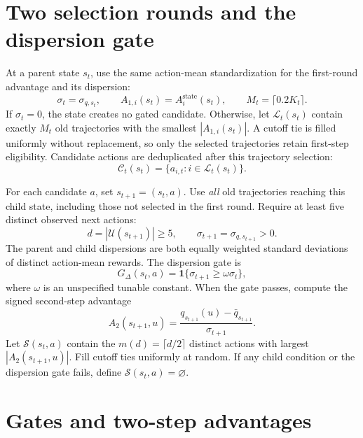 \documentclass[10pt]{article}
\begin{document}
\section{Two selection rounds and the dispersion gate}

At a parent state \(s_t\), use the same action-mean standardization for
the first-round advantage and its dispersion:
\begin{equation}
\sigma_t=\sigma_{q,s_t},\qquad
A_{1,i}(s_t)=A_i^{\mathrm{state}}(s_t),\qquad
M_t=\lceil0.2K_t\rceil.
\end{equation}
If \(\sigma_t=0\), the state creates no gated candidate. Otherwise, let
\(\mathcal L_t(s_t)\) contain exactly \(M_t\) old trajectories with the
smallest \(|A_{1,i}(s_t)|\). A cutoff tie is filled uniformly without
replacement, so only the selected trajectories retain first-step
eligibility. Candidate actions are deduplicated after this trajectory
selection:
\begin{equation}
\mathcal C_t(s_t)=\{a_{i,t}:i\in\mathcal L_t(s_t)\}.
\end{equation}

For each candidate \(a\), set \(s_{t+1}=(s_t,a)\). Use \emph{all} old
trajectories reaching this child state, including those not selected in
the first round. Require at least five distinct observed next actions:
\begin{equation}
d=|\mathcal U(s_{t+1})|\geq5,\qquad
\sigma_{t+1}=\sigma_{q,s_{t+1}}>0.
\end{equation}
The parent and child dispersions are both equally weighted standard
deviations of distinct action-mean rewards. The dispersion gate is
\begin{equation}
G_{\Delta}(s_t,a)
=\mathbf{1}\{\sigma_{t+1}\geq\omega\sigma_t\},
\end{equation}
where \(\omega\) is an unspecified tunable constant. When the gate
passes, compute the signed second-step advantage
\begin{equation}
A_2(s_{t+1},u)
=\frac{q_{s_{t+1}}(u)-\bar q_{s_{t+1}}}{\sigma_{t+1}}.
\end{equation}
Let \(\mathcal S(s_t,a)\) contain the \(m(d)=\lceil d/2\rceil\)
distinct actions with largest \(|A_2(s_{t+1},u)|\). Fill cutoff ties
uniformly at random. If any child condition or the dispersion gate
fails, define \(\mathcal S(s_t,a)=\varnothing\).

\section{Gates and two-step advantages}
\end{document}
